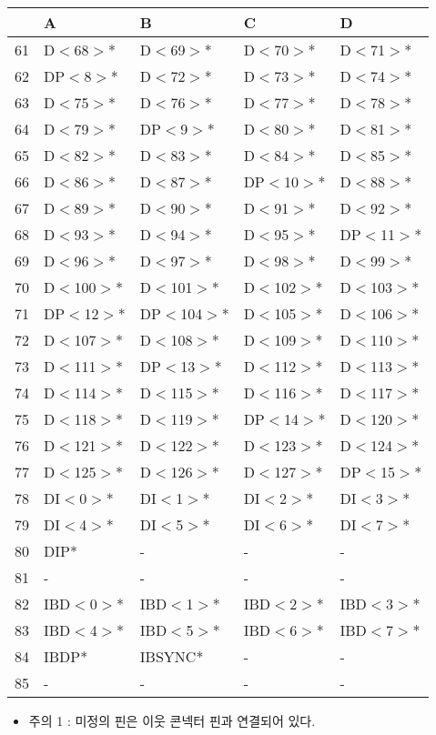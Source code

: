 \begin{table}[htbp]
   \begin{center}
\begingroup
\setlength{\tabcolsep}{6pt} %
\renewcommand{\arraystretch}{0.9} %
   \begin{tabular}{|r|l|l|l|l|} \hline
 &A&B&C&D\\ \hline
61&D$<$68$>$*&D$<$69$>$*&D$<$70$>$*&D$<$71$>$*\\
62&DP$<$8$>$*&D$<$72$>$*&D$<$73$>$*&D$<$74$>$*\\
63&D$<$75$>$*&D$<$76$>$*&D$<$77$>$*&D$<$78$>$*\\
64&D$<$79$>$*&DP$<$9$>$*&D$<$80$>$*&D$<$81$>$*\\
65&D$<$82$>$*&D$<$83$>$*&D$<$84$>$*&D$<$85$>$*\\
66&D$<$86$>$*&D$<$87$>$*&DP$<$10$>$*&D$<$88$>$*\\
67&D$<$89$>$*&D$<$90$>$*&D$<$91$>$*&D$<$92$>$*\\
68&D$<$93$>$*&D$<$94$>$*&D$<$95$>$*&DP$<$11$>$*\\
69&D$<$96$>$*&D$<$97$>$*&D$<$98$>$*&D$<$99$>$*\\
70&D$<$100$>$*&D$<$101$>$*&D$<$102$>$*&D$<$103$>$*\\
71&DP$<$12$>$*&DP$<$104$>$*&D$<$105$>$*&D$<$106$>$*\\
72&D$<$107$>$*&D$<$108$>$*&D$<$109$>$*&D$<$110$>$*\\
73&D$<$111$>$*&DP$<$13$>$*&D$<$112$>$*&D$<$113$>$*\\
74&D$<$114$>$*&D$<$115$>$*&D$<$116$>$*&D$<$117$>$*\\
75&D$<$118$>$*&D$<$119$>$*&DP$<$14$>$*&D$<$120$>$*\\
76&D$<$121$>$*&D$<$122$>$*&D$<$123$>$*&D$<$124$>$*\\
77&D$<$125$>$*&D$<$126$>$*&D$<$127$>$*&DP$<$15$>$*\\
78&DI$<$0$>$*&DI$<$1$>$*&DI$<$2$>$*&DI$<$3$>$*\\
79&DI$<$4$>$*&DI$<$5$>$*&DI$<$6$>$*&DI$<$7$>$*\\
80&DIP*&-&-&-\\
81&-&-&-&-\\
82&IBD$<$0$>$*&IBD$<$1$>$*&IBD$<$2$>$*&IBD$<$3$>$*\\
83&IBD$<$4$>$*&IBD$<$5$>$*&IBD$<$6$>$*&IBD$<$7$>$*\\
84&IBDP*&IBSYNC*&-&-\\
85&-&-&-&-\\
\hline
   \end{tabular}
\endgroup
   \end{center}
\begin{itemize}
  \item 주의 1 :  미정의 핀은 이웃 콘넥터 핀과 연결되어 있다.
\end{itemize}
\end{table}
